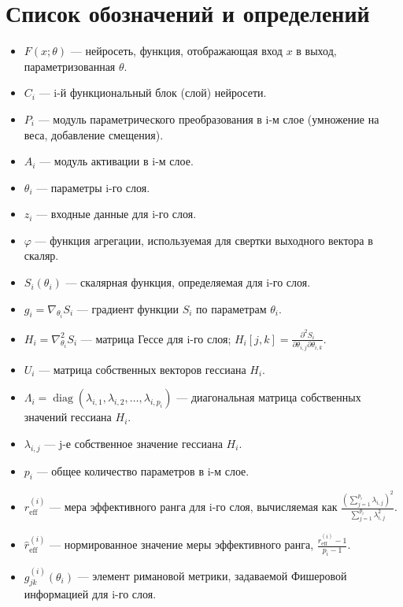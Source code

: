 \documentclass[a4paper,12pt]{article}
\begin{document}
\newpage

\section*{Список обозначений и определений}

\begin{itemize}
\item \(F(x;\theta)\) --- нейросеть, функция, отображающая вход \(x\) в выход, параметризованная \(\theta\).
\item \(C_i\) --- i-й функциональный блок (слой) нейросети.
\item \(P_i\) --- модуль параметрического преобразования в i-м слое (умножение на веса, добавление смещения).
\item \(A_i\) --- модуль активации в i-м слое.
\item \(\theta_i\) --- параметры i-го слоя.
\item \(z_i\) --- входные данные для i-го слоя.
\item \(\varphi\) --- функция агрегации, используемая для свертки выходного вектора в скаляр.
\item \(S_i(\theta_i)\) --- скалярная функция, определяемая для i-го слоя.
\item \(g_i = \nabla_{\theta_i} S_i\) --- градиент функции \(S_i\) по параметрам \(\theta_i\).
\item \(H_i = \nabla^2_{\theta_i} S_i\) --- матрица Гессе для i-го слоя; \(H_i[j,k] = \frac{\partial^2 S_i}{\partial \theta_{i,j}\partial \theta_{i,k}}\).
\item \(U_i\) --- матрица собственных векторов гессиана \(H_i\).
\item \(\Lambda_i = \operatorname{diag}(\lambda_{i,1}, \lambda_{i,2}, \dots, \lambda_{i,p_i})\) --- диагональная матрица собственных значений гессиана \(H_i\).
\item \(\lambda_{i,j}\) --- j-е собственное значение гессиана \(H_i\).
\item \(p_i\) --- общее количество параметров в i-м слое.
\item \(r_{\text{eff}}^{(i)}\) --- мера эффективного ранга для i-го слоя, вычисляемая как \(\frac{\left(\sum_{j=1}^{p_i} \lambda_{i,j}\right)^2}{\sum_{j=1}^{p_i}\lambda_{i,j}^2}\).
\item \(\hat{r}_{\text{eff}}^{(i)}\) --- нормированное значение меры эффективного ранга, \(\frac{r_{\text{eff}}^{(i)} - 1}{p_i - 1}\).
\item \(g^{(i)}_{jk}(\theta_i)\) --- элемент римановой метрики, задаваемой Фишеровой информацией для i-го слоя.

\end{itemize}
\end{document}
